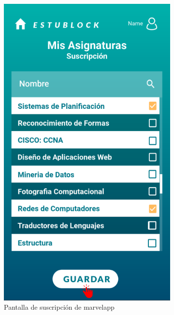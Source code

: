 \vspace{1cm}

\begin{figure}[hbt]
	\centering
	\begin{subfigure}[b]{0.4\linewidth}
		\centering
        \includegraphics[width=0.7\linewidth]{figs/Desarrollo/Interfaz/marvel_asignaturas}
        \caption[Marvel Suscribirse]{Pantalla de suscripción de marvelapp}
	\end{subfigure} 
	\begin{subfigure}[b]{0.4\linewidth}
		\centering

\end{subfigure}
\end{figure}
